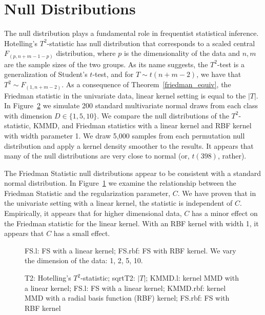 \section{Null Distributions}
The null distribution plays a fundamental role in frequentist statistical
inference.  Hotelling's $T^2$-statistic has null distribution that
corresponds to a scaled central $F_{(p, n+m-1-p)}$ distribution, where
$p$ is the dimensionality of the data and $n, m$ are the sample sizes
of the two groups.  As its name suggests, the $T^2$-test is a
generalization of Student's $t$-test, and for $T \sim t(n+m-2)$, we
have that $T^2 \sim F_{(1, n+m-2)}$.  As a consequence of
Theorem~\ref{friedman_equiv}, the Friedman statistic in the univariate
data, linear kernel setting is equal to the $|T|$.  In Figure~\ref{fig:null_dist} we simulate
200 standard multivariate normal draws from each class with dimension
$D \in \{1, 5, 10\}$.  We compare the null distributions of the
$T^2$-statistic, KMMD, and Friedman statistics with a linear kernel
and RBF kernel with width parameter 1.  We draw 5,000 samples from
each permutation null distribution and apply a kernel density smoother
to the results.  It appears that many of the null distributions are
very close to normal (or, $t(398)$, rather).

The Friedman Statistic null distributions appear to be consistent with
a standard normal distribution.  In Figure~\ref{fig:c_param} we
examine the relationship between the Friedman Statistic and the
regularization parameter, $C$.  We have proven that in the univariate
setting with a linear kernel, the statistic is independent of $C$.
Empirically, it appears that for higher dimensional data, $C$ has
a minor effect on the Friedman statistic for the linear kernel.
With an RBF kernel with width 1, it appears that $C$ has a small effect.
\begin{figure}
  \begin{center}
    \resizebox{14.0cm}{!}{
      
    }
  \end{center}
\caption{FS.l: FS with a linear kernel; FS.rbf: FS with RBF kernel. We vary
the dimension of the data: 1, 2, 5, 10.}
\label{fig:c_param}
\end{figure}

\begin{figure}
  \begin{center}
    \resizebox{14.0cm}{!}{
      
    }
  \end{center}
\caption{T2: Hotelling's $T^2$-statistic; sqrtT2: $|T|$;
KMMD.l: kernel MMD with a linear kernel; FS.l: FS with a
linear kernel; KMMD.rbf: kernel MMD with a radial basis function (RBF) kernel;
FS.rbf: FS with RBF kernel}
\label{fig:null_dist}
\end{figure}

